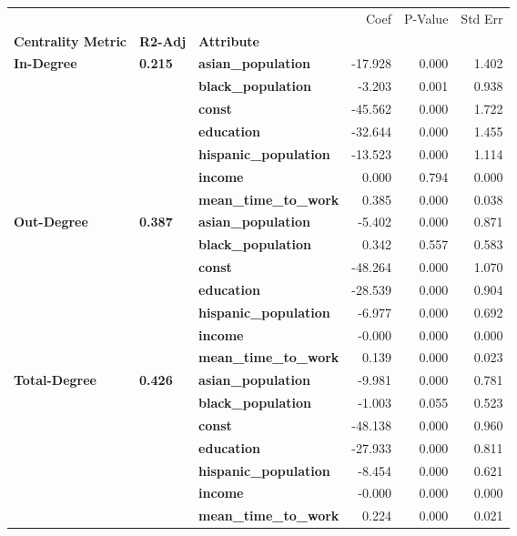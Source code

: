 \begin{tabular}{lllrrr}
\toprule
             &       &                   &    Coef &  P-Value &  Std Err \\
\textbf{Centrality Metric} & \textbf{R2-Adj} & \textbf{Attribute} &         &          &          \\
\midrule
\multirow{7}{*}{\textbf{In-Degree}} & \multirow{7}{*}{\textbf{0.215}} & \textbf{asian\_population} & -17.928 &    0.000 &    1.402 \\
             &       & \textbf{black\_population} &  -3.203 &    0.001 &    0.938 \\
             &       & \textbf{const} & -45.562 &    0.000 &    1.722 \\
             &       & \textbf{education} & -32.644 &    0.000 &    1.455 \\
             &       & \textbf{hispanic\_population} & -13.523 &    0.000 &    1.114 \\
             &       & \textbf{income} &   0.000 &    0.794 &    0.000 \\
             &       & \textbf{mean\_time\_to\_work} &   0.385 &    0.000 &    0.038 \\
\cline{1-6}
\cline{2-6}
\multirow{7}{*}{\textbf{Out-Degree}} & \multirow{7}{*}{\textbf{0.387}} & \textbf{asian\_population} &  -5.402 &    0.000 &    0.871 \\
             &       & \textbf{black\_population} &   0.342 &    0.557 &    0.583 \\
             &       & \textbf{const} & -48.264 &    0.000 &    1.070 \\
             &       & \textbf{education} & -28.539 &    0.000 &    0.904 \\
             &       & \textbf{hispanic\_population} &  -6.977 &    0.000 &    0.692 \\
             &       & \textbf{income} &  -0.000 &    0.000 &    0.000 \\
             &       & \textbf{mean\_time\_to\_work} &   0.139 &    0.000 &    0.023 \\
\cline{1-6}
\cline{2-6}
\multirow{7}{*}{\textbf{Total-Degree}} & \multirow{7}{*}{\textbf{0.426}} & \textbf{asian\_population} &  -9.981 &    0.000 &    0.781 \\
             &       & \textbf{black\_population} &  -1.003 &    0.055 &    0.523 \\
             &       & \textbf{const} & -48.138 &    0.000 &    0.960 \\
             &       & \textbf{education} & -27.933 &    0.000 &    0.811 \\
             &       & \textbf{hispanic\_population} &  -8.454 &    0.000 &    0.621 \\
             &       & \textbf{income} &  -0.000 &    0.000 &    0.000 \\
             &       & \textbf{mean\_time\_to\_work} &   0.224 &    0.000 &    0.021 \\
\bottomrule
\end{tabular}
